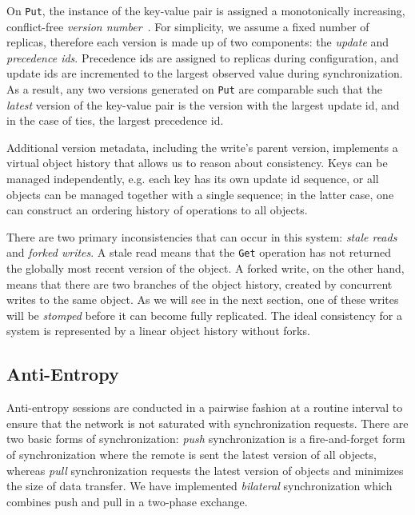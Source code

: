 On \texttt{Put}, the instance of the key-value pair is assigned a
monotonically increasing, conflict-free \textit{version
number}~\cite{almeida_version_2002}.
For simplicity, we assume a fixed number of replicas, therefore each version
is made up of two components: the \textit{update} and \textit{precedence ids}.
Precedence ids are assigned to replicas during configuration, and update ids
are incremented to the largest observed value during synchronization.
As a result, any two versions generated on \texttt{Put} are comparable such
that the \textit{latest} version of the key-value pair is the version with the
largest update id, and in the case of ties, the largest precedence id.

Additional version metadata, including the write's parent version, implements
a virtual object history that allows us to reason about consistency.
Keys can be managed independently, e.g. each key has its own update id
sequence, or all objects can be managed together with a single sequence; in
the latter case, one can construct an ordering history of operations to all
objects.

There are two primary inconsistencies that can occur in this system:
\textit{stale reads} and \textit{forked writes}.
A stale read means that the \texttt{Get} operation has not returned
the globally most recent version of the object.
A forked write, on the other hand, means that there are two branches of the
object history, created by concurrent writes to the same object.
As we will see in the next section, one of these writes will be
\textit{stomped} before it can become fully replicated.
The ideal consistency for a system is represented by a linear object history
without forks.

\subsection*{Anti-Entropy}

Anti-entropy sessions are conducted in a pairwise fashion at a routine
interval to ensure that the network is not saturated with synchronization
requests.
There are two basic forms of synchronization: \textit{push} synchronization
is a fire-and-forget form of synchronization where the remote is sent the
latest version of all objects, whereas \textit{pull} synchronization requests
the latest version of objects and minimizes the size of data transfer.
We have implemented \textit{bilateral} synchronization which combines push
and pull in a two-phase exchange.

